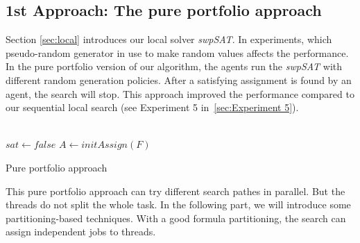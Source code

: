 \documentclass[12pt,a4paper,twoside]{scrartcl}
\numberwithin{equation}{section}
\begin{document}
\subsection{1st Approach: The pure portfolio approach}
Section \ref{sec:local} introduces our local solver \emph{swpSAT}. In experiments, which pseudo-random generator in use to make random values affects the performance. In the pure portfolio version of our algorithm, the agents run the \emph{swpSAT} with different random generation policies. After a satisfying assignment is found by an agent, the search will stop. This approach improved the performance compared to our sequential local search (see Experiment 5 in~\ref{sec:Experiment 5}).\\ 
\\
\begin{algorithm}[H]
  $sat \leftarrow false$\;
    $A \leftarrow initAssign(F)$\;
 \caption{Pure portfolio approach}
\end{algorithm}  
This pure portfolio approach can try different search pathes in parallel. But the threads do not split the whole task. 
In the following part, we will introduce some partitioning-based techniques. With a good formula partitioning, the search can assign independent jobs to threads. 
\end{document}
